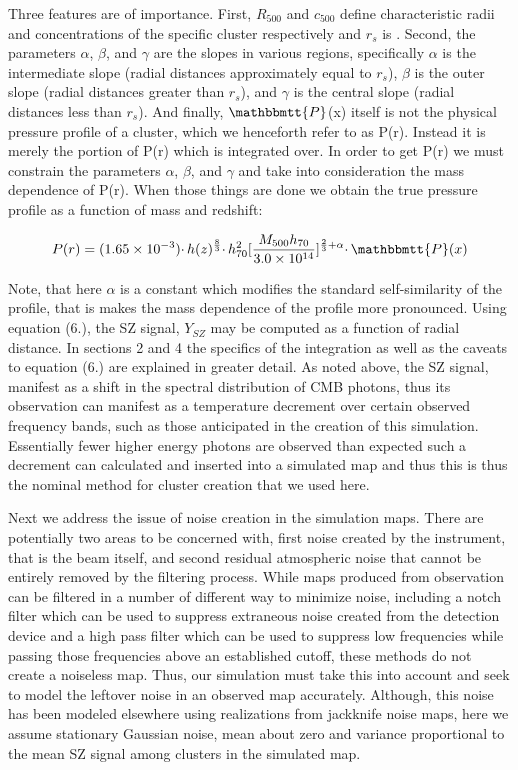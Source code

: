 \documentclass[12pt]{article} %
\begin{document}
Three features are of importance. First, $R_{500}$ and $c_{500}$ define characteristic radii and concentrations of the specific cluster respectively and $r_s$ is . Second, the parameters $\alpha$, $\beta$, and $\gamma$ are the slopes in various regions, specifically $\alpha$ is the intermediate slope (radial distances approximately equal to $r_s$), $\beta$ is the outer slope (radial distances greater than $r_s$), and $\gamma$ is the central slope (radial distances less than $r_s$).  And finally,  $\mathbbmtt{P}$(x) itself is not the physical pressure profile of a cluster, which we henceforth refer to as P(r). Instead it is merely the portion of P(r) which is integrated over. In order to get P(r) we must constrain the parameters $\alpha$, $\beta$, and $\gamma$ and take into consideration the mass dependence of P(r). When those things are done we obtain the true pressure profile as a function of mass and redshift: 

\begin{equation}
P(r) = (1.65 \times 10^{-3}) \cdotp h(z)^\frac{8}{3} \cdotp h^2_{70}[\frac{M_{500}h_{70}}{3.0 \times 10^{14}}]^{\frac{2}{3} + \alpha} \cdotp \mathbbmtt{P}(x)
\end{equation}

Note, that here $\alpha$ is a constant which modifies the standard self-similarity of the profile, that is makes the mass dependence of the profile more pronounced. Using equation (6.), the SZ signal, $Y_{SZ}$ may be computed as a function of radial distance. In sections 2 and 4 the specifics of the integration as well as the caveats to equation (6.) are explained in greater detail. As noted above, the SZ signal, manifest as a shift in the spectral distribution of CMB photons, thus its observation can manifest as a temperature decrement over certain observed frequency bands, such as those anticipated in the creation of this simulation. Essentially fewer higher energy photons are observed than expected such a decrement can calculated and inserted into a simulated map and thus this is thus the nominal method for cluster creation that we used here.

Next we address the issue of noise creation in the simulation maps. There are potentially two areas to be concerned with, first noise created by the instrument, that is the beam itself, and second residual atmospheric noise that cannot be entirely removed by the filtering process. While maps produced from observation can be filtered in a number of different way to minimize noise, including a notch filter which can be used to suppress extraneous noise created from the detection device and a high pass filter which can be used to suppress low frequencies while passing those frequencies above an established cutoff, these methods do not create a noiseless map. Thus, our simulation must take this into account and seek to model the leftover noise in an observed map accurately. Although, this noise has been modeled elsewhere using realizations from jackknife noise maps, here we assume stationary Gaussian noise, mean about zero and variance proportional to the mean SZ signal among clusters in the simulated map.
\end{document}
